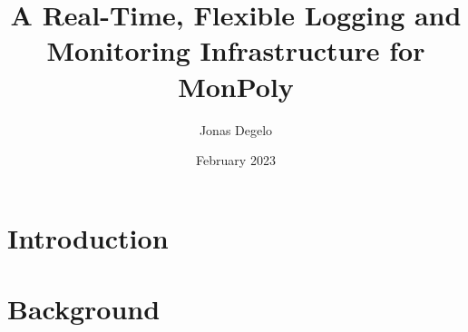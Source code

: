 \documentclass{article}
\title{A Real-Time, Flexible Logging and Monitoring Infrastructure for MonPoly}
\author{Jonas Degelo}
\date{February 2023}
\begin{document}
\maketitle

\section{Introduction}
\section{Background}
\end{document}
